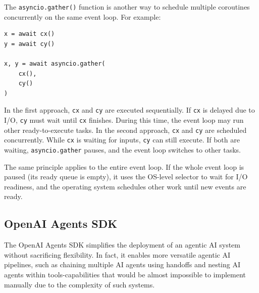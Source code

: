 The \texttt{asyncio.gather()} function is another way to schedule multiple coroutines concurrently on the same event loop. For example:
\begin{lstlisting}
x = await cx()
y = await cy()

x, y = await asyncio.gather(
    cx(), 
    cy()
)
\end{lstlisting}
In the first approach, \verb|cx| and \verb|cy| are executed sequentially. If \verb|cx| is delayed due to I/O, \verb|cy| must wait until \verb|cx| finishes. During this time, the event loop may run other ready-to-execute tasks. In the second approach, \verb|cx| and \verb|cy| are scheduled concurrently. While \verb|cx| is waiting for inputs, \verb|cy| can still execute. If both are waiting, \verb|asyncio.gather| pauses, and the event loop switches to other tasks.

The same principle applies to the entire event loop. If the whole event loop is paused (its ready queue is empty), it uses the OS-level selector to wait for I/O readiness, and the operating system schedules other work until new events are ready.

\subsection{OpenAI Agents SDK}

The OpenAI Agents SDK simplifies the deployment of an agentic AI system without sacrificing flexibility. In fact, it enables more versatile agentic AI pipelines, such as chaining multiple AI agents using handoffs and nesting AI agents within tools-capabilities that would be almost impossible to implement manually due to the complexity of such systems.

